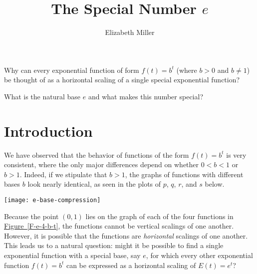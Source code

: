 \documentclass[nooutcomes]{ximera}
\author{Elizabeth Miller}
\title{The Special Number $e$}
\begin{document}
\begin{abstract}
  
\end{abstract}
\maketitle



\begin{motivatingQuestions}
\item Why can every exponential function of form \(f(t) = b^t\) (where \(b \gt 0\) and \(b \ne 1\)) be thought of as a horizontal scaling of a single special exponential function?
\item What is the natural base \(e\) and what makes this number special?
\end{motivatingQuestions}



\section{Introduction}
We have observed that the behavior of functions of the form \(f(t) = b^t\) is very consistent, where the only major differences depend on whether \(0< b < 1\) or \(b > 1\).  Indeed, if we stipulate that \(b \gt 1\), the graphs of functions with different bases \(b\) look nearly identical, as seen in the plots of \(p\), \(q\), \(r\), and \(s\) below.

\begin{image}
\texttt{[image: e-base-compression]}
\end{image}
Because the point \((0,1)\) lies on the graph of each of the four functions in \hyperref[F-e-4-b-t]{Figure~\ref{F-e-4-b-t}}, the functions cannot be vertical scalings of one another.  However, it is possible that the functions are \emph{horizontal} scalings of one another.  This leads us to a natural question:  might it be possible to find a single exponential function with a special base, say \(e\), for which every other exponential function \(f(t) = b^t\) can be expressed as a horizontal scaling of \(E(t) = e^t\)?
\end{document}
